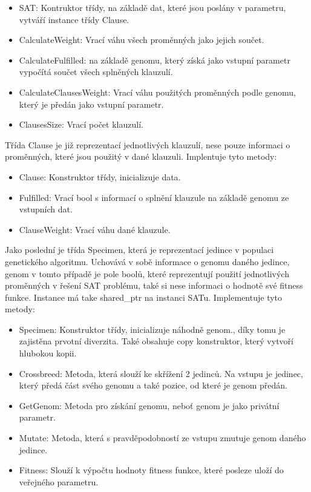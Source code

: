 \documentclass{article}
\begin{document}
    \begin{itemize}
        \item {SAT: Kontruktor třídy, na základě dat, které jsou poslány v parametru, vytváří instance třídy Clause.}
        \item {CalculateWeight: Vrací váhu všech proměnných jako jejich součet.}
        \item {CalculateFulfilled: na základě genomu, který získá jako vstupní parametr vypočítá součet všech splněných klauzulí.}
        \item {CalculateClausesWeight: Vrací váhu použitých proměnných podle genomu, který je předán jako vstupní parametr.}
        \item {ClausesSize: Vrací počet klauzulí.}
    \end{itemize}

    Třída Clause je již reprezentací jednotlivých klauzulí, nese pouze informaci o proměnných, které jsou použitý v dané klauzuli. Implentuje tyto metody:

    \begin{itemize}
        \item {Clause: Konstruktor třídy, inicializuje data.}
        \item {Fulfilled: Vrací bool s informací o splnění klauzule na základě genomu ze vstupních dat.}
        \item {ClauseWeight: Vrací váhu dané klauzule.}
    \end{itemize}

    Jako poslední je třída Specimen, která je reprezentací jedince v populaci genetického algoritmu. Uchovává v sobě informace o genomu daného jedince,
    genom v tomto případě je pole boolů, které reprezentují použití jednotlivých proměnných v řešení SAT problému, také si nese informaci o hodnotě své fitness funkce.
    Instance má take shared\_ptr na instanci SATu. Implementuje tyto metody:

    \begin{itemize}
        \item {Specimen: Konstruktor třídy, inicializuje náhodně genom., díky tomu je zajistěna prvotní diverzita. Také obsahuje copy konstruktor, který vytvoří hlubokou kopii.}
        \item {Crossbreed: Metoda, která slouží ke skřížení 2 jedinců. Na vstupu je jedinec, který předá část svého genomu a také pozice, od které je genom předán.}
        \item {GetGenom: Metoda pro získání genomu, neboť genom je jako privátní parametr.}
        \item {Mutate: Metoda, která s pravděpodobností ze vstupu zmutuje genom daného jedince.}
        \item {Fitness: Slouží k výpočtu hodnoty fitness funkce, které posleze uloží do veřejného parametru.}
    \end{itemize}
\end{document}
